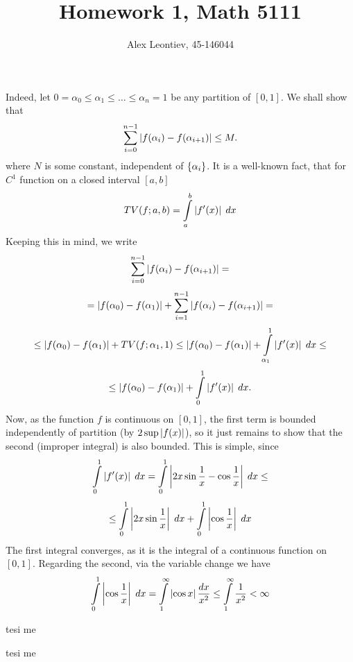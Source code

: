 \documentclass[10pt]{article} %
\title{Homework 1, Math 5111}
\author{Alex Leontiev, 45-146044}
\begin{document}
\maketitle
\begin{enumerate}[\bf{[}1{]}]
	\item Indeed, let $0=\alpha_0\leq\alpha_1\leq\hdots\leq\alpha_n=1$ be any partition of $[0,1]$. We shall show that
		\[\sum_{i=0}^{n-1}\myabs{f(\alpha_i)-f(\alpha_{i+1})}\leq M.\]
		where $N$ is some constant, independent of $\left\{\alpha_i\right\}$. It is a well-known fact, that for $C^1$ function
		on a closed interval $[a,b]$
		\[TV(f;a,b)=\int_a^b\myabs{f'(x)}\;dx\]
		Keeping this in mind, we write
		\[\sum_{i=0}^{n-1}\myabs{f(\alpha_i)-f(\alpha_{i+1})}=\]
		\[=\myabs{f(\alpha_0)-f(\alpha_1)}+\sum_{i=1}^{n-1}\myabs{f(\alpha_i)-f(\alpha_{i+1})}=\]
		\[\leq\myabs{f(\alpha_0)-f(\alpha_1)}+TV(f;\alpha_1,1)
		\leq\myabs{f(\alpha_0)-f(\alpha_1)}+\int_{\alpha_1}^1\myabs{f'(x)}\;dx\leq\]
		\[\leq\myabs{f(\alpha_0)-f(\alpha_1)}+\int_0^1\myabs{f'(x)}\;dx.\]
		Now, as the function $f$ is continuous on $[0,1]$, the first term is bounded independently of partition (by $2\sup
		\myabs{f(x)}$), so it just remains to show that the second (improper integral) is also bounded. This is simple, since
		\[\int_0^1\myabs{f'(x)}\;dx=\int_0^1\myabs{2x\sin\frac{1}{x}-\cos\frac{1}{x}}\;dx\leq\]
		\[\leq\int_0^1\myabs{2x\sin\frac{1}{x}}\;dx+\int_0^1\myabs{\cos\frac{1}{x}}\;dx\]
		The first integral converges, as it is the integral of a continuous function on $[0,1]$. Regarding the second,
		via the variable change we have
		\[\int_0^1\myabs{\cos\frac{1}{x}}\;dx=\int_1^{\infty}\myabs{\cos x}\frac{dx}{x^2}\leq\int_1^{\infty}\frac{1}{x^2}
		<\infty\]
	\item tesi me %
		\setcounter{enumi}{5}
	\item tesi me
\end{enumerate}
\end{document}
